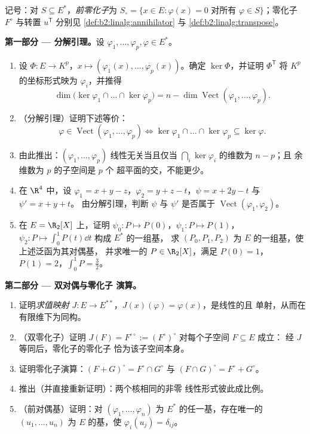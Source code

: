 \begin{problem}
\label{pb:b2:linalg:1}
记号：对 $S \subseteq E^*$，\emph{前零化子}为
$S_\circ = \{x \in E : \varphi(x) = 0 \text{ 对所有 } \varphi
\in S\}$；零化子 $F^\circ$ 与转置 $u^{\mathsf T}$
分别见 \cref{def:b2:linalg:annihilator} 与
\cref{def:b2:linalg:transpose}。

\medskip
\noindent\textbf{第一部分 --- 分解引理。}设
$\varphi_1, \dots, \varphi_p, \varphi \in E^*$。
\begin{enumerate}
  \item 设 $\Phi \colon E \to K^p$，$x \mapsto (\varphi_1(x),
        \dots, \varphi_p(x))$。确定 $\ker\Phi$，并证明
        $\Phi^{\mathsf T}$ 将 $K^p$ 的坐标形式映为
        $\varphi_i$，并推得
        \[
        \dim \bigl(\ker\varphi_1 \cap \dots \cap
        \ker\varphi_p\bigr) = n - \dim
        \operatorname{Vect}(\varphi_1, \dots, \varphi_p).
        \]
  \item （分解引理）证明下述等价：
        \[
        \varphi \in \operatorname{Vect}(\varphi_1, \dots,
        \varphi_p)
        \iff
        \ker\varphi_1 \cap \dots \cap \ker\varphi_p \subseteq
        \ker\varphi .
        \]
  \item 由此推出：$(\varphi_1, \dots, \varphi_p)$ 线性无关当且仅当
        $\bigcap_i \ker\varphi_i$ 的维数为 $n - p$；且
        余维数为 $p$ 的子空间是 $p$ 个
        超平面的交，不能更少。
  \item 在 $\R^4$ 中，设 $\varphi_1 = x + y - z$，$\varphi_2 = y +
        z - t$，$\psi = x + 2y - t$ 与 $\psi' = x + y + t$。
        由分解引理，判断 $\psi$ 与
        $\psi'$ 是否属于 $\operatorname{Vect}(\varphi_1,
        \varphi_2)$。
  \item 在 $E = \R_2[X]$ 上，证明 $\psi_0 \colon P \mapsto
        P(0)$，$\psi_1 \colon P \mapsto P(1)$，$\psi_2 \colon P
        \mapsto \int_0^1 P(t)\dd t$ 构成 $E^*$ 的一组基，
        求 $(P_0, P_1, P_2)$ 为 $E$ 的一组基，使上述泛函为其对偶基，
        并求唯一的 $P \in \R_2[X]$，满足 $P(0)
        = 1$，$P(1) = 2$，$\int_0^1 P = \frac32$。
\end{enumerate}

\medskip
\noindent\textbf{第二部分 --- 双对偶与零化子
演算。}
\begin{enumerate}[resume]
  \item 证明\emph{求值映射} $J \colon E \to
        E^{**}$，$J(x)(\varphi) = \varphi(x)$，是线性的且
        单射，从而在有限维下为同构。
  \item （双零化子）证明 $J(F) = F^{\circ\circ} :=
        (F^\circ)^\circ$ 对每个子空间 $F \subseteq E$ 成立：
        经 $J$ 等同后，零化子的零化子
        恰为该子空间本身。
  \item 证明零化子演算：$(F + G)^\circ = F^\circ
        \cap G^\circ$ 与 $(F \cap G)^\circ = F^\circ + G^\circ$。
  \item 推出（并直接重新证明）：两个核相同的非零
        线性形式彼此成比例。
  \item （前对偶基）证明：对 $(\varphi_1,
        \dots, \varphi_n)$ 为 $E^*$ 的任一基，存在唯一的
        $(u_1, \dots, u_n)$ 为 $E$ 的基，使 $\varphi_i(u_j) =
        \delta_{ij}$。
\end{enumerate}


\end{problem}
